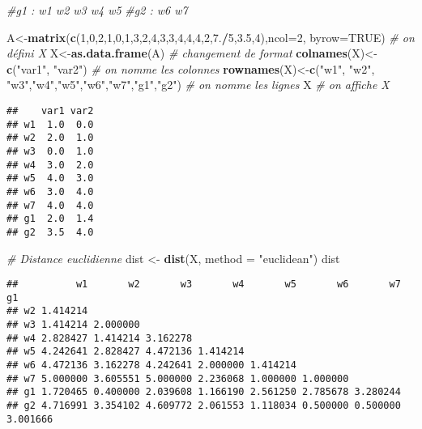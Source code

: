 \documentclass[
]{article}
\newenvironment{Shaded}{\begin{snugshade}}{\end{snugshade}}
\newcommand{\CommentTok}[1]{\textcolor[rgb]{0.56,0.35,0.01}{\textit{#1}}}
\newcommand{\DataTypeTok}[1]{\textcolor[rgb]{0.13,0.29,0.53}{#1}}
\newcommand{\DecValTok}[1]{\textcolor[rgb]{0.00,0.00,0.81}{#1}}
\newcommand{\FloatTok}[1]{\textcolor[rgb]{0.00,0.00,0.81}{#1}}
\newcommand{\KeywordTok}[1]{\textcolor[rgb]{0.13,0.29,0.53}{\textbf{#1}}}
\newcommand{\NormalTok}[1]{#1}
\newcommand{\OperatorTok}[1]{\textcolor[rgb]{0.81,0.36,0.00}{\textbf{#1}}}
\newcommand{\OtherTok}[1]{\textcolor[rgb]{0.56,0.35,0.01}{#1}}
\newcommand{\StringTok}[1]{\textcolor[rgb]{0.31,0.60,0.02}{#1}}
\begin{document}
\begin{Shaded}
\begin{Highlighting}[]
\CommentTok{#g1  : w1 w2 w3 w4 w5}
\CommentTok{#g2  : w6 w7 }

\NormalTok{A<-}\KeywordTok{matrix}\NormalTok{(}\KeywordTok{c}\NormalTok{(}\DecValTok{1}\NormalTok{,}\DecValTok{0}\NormalTok{,}\DecValTok{2}\NormalTok{,}\DecValTok{1}\NormalTok{,}\DecValTok{0}\NormalTok{,}\DecValTok{1}\NormalTok{,}\DecValTok{3}\NormalTok{,}\DecValTok{2}\NormalTok{,}\DecValTok{4}\NormalTok{,}\DecValTok{3}\NormalTok{,}\DecValTok{3}\NormalTok{,}\DecValTok{4}\NormalTok{,}\DecValTok{4}\NormalTok{,}\DecValTok{4}\NormalTok{,}\DecValTok{2}\NormalTok{,}\FloatTok{7.}\OperatorTok{/}\DecValTok{5}\NormalTok{,}\FloatTok{3.5}\NormalTok{,}\DecValTok{4}\NormalTok{),}\DataTypeTok{ncol=}\DecValTok{2}\NormalTok{, }\DataTypeTok{byrow=}\OtherTok{TRUE}\NormalTok{) }\CommentTok{# on défini X}
\NormalTok{X<-}\KeywordTok{as.data.frame}\NormalTok{(A) }\CommentTok{# changement de format}
\KeywordTok{colnames}\NormalTok{(X)<-}\KeywordTok{c}\NormalTok{(}\StringTok{"var1"}\NormalTok{, }\StringTok{"var2"}\NormalTok{) }\CommentTok{# on nomme les colonnes}
\KeywordTok{rownames}\NormalTok{(X)<-}\KeywordTok{c}\NormalTok{(}\StringTok{"w1"}\NormalTok{, }\StringTok{"w2"}\NormalTok{, }\StringTok{"w3"}\NormalTok{,}\StringTok{"w4"}\NormalTok{,}\StringTok{"w5"}\NormalTok{,}\StringTok{"w6"}\NormalTok{,}\StringTok{"w7"}\NormalTok{,}\StringTok{"g1"}\NormalTok{,}\StringTok{"g2"}\NormalTok{) }\CommentTok{# on nomme les lignes}
\NormalTok{X }\CommentTok{# on affiche X}
\end{Highlighting}
\end{Shaded}

\begin{verbatim}
##    var1 var2
## w1  1.0  0.0
## w2  2.0  1.0
## w3  0.0  1.0
## w4  3.0  2.0
## w5  4.0  3.0
## w6  3.0  4.0
## w7  4.0  4.0
## g1  2.0  1.4
## g2  3.5  4.0
\end{verbatim}

\begin{Shaded}
\begin{Highlighting}[]
\CommentTok{# Distance euclidienne}
\NormalTok{dist <-}\StringTok{ }\KeywordTok{dist}\NormalTok{(X, }\DataTypeTok{method =} \StringTok{"euclidean"}\NormalTok{)}
\NormalTok{dist}
\end{Highlighting}
\end{Shaded}

\begin{verbatim}
##          w1       w2       w3       w4       w5       w6       w7       g1
## w2 1.414214                                                               
## w3 1.414214 2.000000                                                      
## w4 2.828427 1.414214 3.162278                                             
## w5 4.242641 2.828427 4.472136 1.414214                                    
## w6 4.472136 3.162278 4.242641 2.000000 1.414214                           
## w7 5.000000 3.605551 5.000000 2.236068 1.000000 1.000000                  
## g1 1.720465 0.400000 2.039608 1.166190 2.561250 2.785678 3.280244         
## g2 4.716991 3.354102 4.609772 2.061553 1.118034 0.500000 0.500000 3.001666
\end{verbatim}
\end{document}
